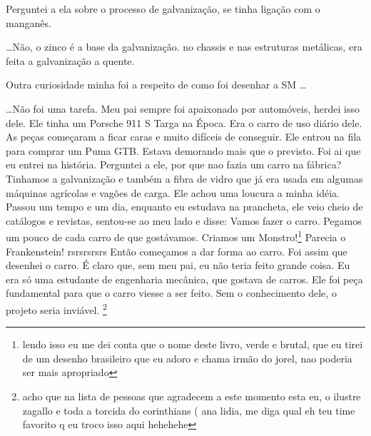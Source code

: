 \documentclass[a4paper]{report}
\begin{document}
Perguntei a ela sobre o processo de galvaniza\c{c}\~ao, se tinha liga\c{c}\~ao com o mangan\^es. 

\dots N\~ao, o zinco \'e a base da galvaniza\c{c}\~ao. no chassis e nas estruturas met\'alicas, era feita a galvaniza\c{c}\~ao a quente.

Outra curiosidade minha foi a respeito de como foi desenhar a SM \dots

\dots N\~ao foi uma tarefa. Meu pai sempre foi apaixonado por autom\'oveis, herdei isso dele. Ele tinha um Porsche 911 S Targa na \'Epoca. Era o carro de uso di\'ario dele. As pe\c{c}as come\c{c}aram a ficar caras e muito dif\'iceis de conseguir. Ele entrou na fila para comprar um Puma GTB. Estava demorando mais que o previsto. Foi ai que eu entrei na hist\'oria. Perguntei a ele, por que nao fazia um carro na f\'abrica? 
Tinhamos a galvaniza\c{c}\~ao e tamb\'em a fibra de vidro que j\'a era usada em algumas m\'aquinas agr\'icolas e vag\~oes de carga. Ele achou uma loucura a minha id\'eia.
Passou um tempo e um dia, enquanto eu estudava na prancheta, ele veio cheio de cat\'alogos e revistas, sentou-se ao meu lado e disse: Vamos fazer o carro.
Pegamos um pouco de cada carro de que gost\'avamos. Criamos um Monstro!\footnote{lendo isso eu me dei conta que o nome deste livro, verde e brutal, que eu tirei de um desenho brasileiro que eu adoro e chama irm\~ao do jorel, nao poderia ser mais apropriado} 
Parecia o Frankenstein! rsrsrsrsrs
Ent\~ao come\c{c}amos a dar forma ao carro.
Foi assim que desenhei o carro. \'E claro que, sem meu pai, eu n\~ao teria feito grande coisa. Eu era s\'o uma estudante de engenharia mec\^anica, que gostava de carros. Ele foi pe\c{c}a fundamental para que o carro viesse a ser feito. Sem o conhecimento dele, o projeto seria invi\'avel. \footnote{acho que na lista de pessoas que agradecem a este momento esta eu, o ilustre zagallo e toda a torcida do corinthians ( ana lidia, me diga qual eh teu time favorito q eu troco isso aqui hehehehe }


\clearpage



\printindex
 
\end{document}
